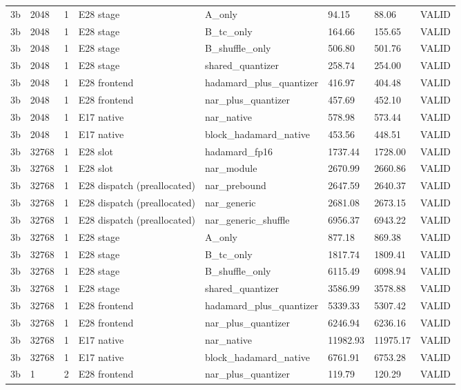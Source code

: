 {\begin{longtable}{llllllll}
3b & 2048 & 1 & E28 stage & A\_only & 94.15 & 88.06 & VALID \\
3b & 2048 & 1 & E28 stage & B\_tc\_only & 164.66 & 155.65 & VALID \\
3b & 2048 & 1 & E28 stage & B\_shuffle\_only & 506.80 & 501.76 & VALID \\
3b & 2048 & 1 & E28 stage & shared\_quantizer & 258.74 & 254.00 & VALID \\
3b & 2048 & 1 & E28 frontend & hadamard\_plus\_quantizer & 416.97 & 404.48 & VALID \\
3b & 2048 & 1 & E28 frontend & nar\_plus\_quantizer & 457.69 & 452.10 & VALID \\
3b & 2048 & 1 & E17 native & nar\_native & 578.98 & 573.44 & VALID \\
3b & 2048 & 1 & E17 native & block\_hadamard\_native & 453.56 & 448.51 & VALID \\
3b & 32768 & 1 & E28 slot & hadamard\_fp16 & 1737.44 & 1728.00 & VALID \\
3b & 32768 & 1 & E28 slot & nar\_module & 2670.99 & 2660.86 & VALID \\
3b & 32768 & 1 & E28 dispatch (preallocated) & nar\_prebound & 2647.59 & 2640.37 & VALID \\
3b & 32768 & 1 & E28 dispatch (preallocated) & nar\_generic & 2681.08 & 2673.15 & VALID \\
3b & 32768 & 1 & E28 dispatch (preallocated) & nar\_generic\_shuffle & 6956.37 & 6943.22 & VALID \\
3b & 32768 & 1 & E28 stage & A\_only & 877.18 & 869.38 & VALID \\
3b & 32768 & 1 & E28 stage & B\_tc\_only & 1817.74 & 1809.41 & VALID \\
3b & 32768 & 1 & E28 stage & B\_shuffle\_only & 6115.49 & 6098.94 & VALID \\
3b & 32768 & 1 & E28 stage & shared\_quantizer & 3586.99 & 3578.88 & VALID \\
3b & 32768 & 1 & E28 frontend & hadamard\_plus\_quantizer & 5339.33 & 5307.42 & VALID \\
3b & 32768 & 1 & E28 frontend & nar\_plus\_quantizer & 6246.94 & 6236.16 & VALID \\
3b & 32768 & 1 & E17 native & nar\_native & 11982.93 & 11975.17 & VALID \\
3b & 32768 & 1 & E17 native & block\_hadamard\_native & 6761.91 & 6753.28 & VALID \\
3b & 1 & 2 & E28 frontend & nar\_plus\_quantizer & 119.79 & 120.29 & VALID \\

\end{longtable}}
